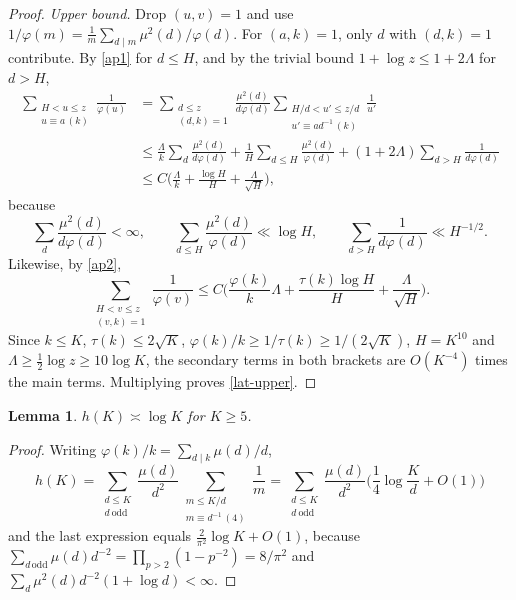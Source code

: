 \documentclass[11pt,reqno]{amsart}
\newtheorem{lemma}[theorem]{Lemma}
\begin{document}
\begin{proof}
\emph{Upper bound.}  Drop $(u,v)=1$ and use $1/\varphi(m)=\frac1m\sum_{d\mid m}\mu^2(d)/\varphi(d)$.
For $(a,k)=1$, only $d$ with $(d,k)=1$ contribute.  By \eqref{ap1} for
$d\le H$, and by the trivial bound $1+\log z\le1+2\Lambda$ for $d>H$,
\[
\begin{aligned}
 \sum_{\substack{H<u\le z\\ u\equiv a\,(k)}}\frac1{\varphi(u)}
 &=\sum_{\substack{d\le z\\(d,k)=1}}\frac{\mu^2(d)}{d\varphi(d)}
   \sum_{\substack{H/d<u'\le z/d\\ u'\equiv ad^{-1}\,(k)}}\frac1{u'}\\
 &\le\frac{\Lambda}{k}\sum_d\frac{\mu^2(d)}{d\varphi(d)}+\frac1H\sum_{d\le H}\frac{\mu^2(d)}{\varphi(d)}
 +(1+2\Lambda)\sum_{d>H}\frac{1}{d\varphi(d)}\\
 &\le C\Big(\frac{\Lambda}{k}+\frac{\log H}{H}+\frac{\Lambda}{\sqrt H}\Big),
\end{aligned}
\]
because
\[
 \sum_d\frac{\mu^2(d)}{d\varphi(d)}<\infty,\qquad
 \sum_{d\le H}\frac{\mu^2(d)}{\varphi(d)}\ll\log H,\qquad
 \sum_{d>H}\frac1{d\varphi(d)}\ll H^{-1/2}.
\]
Likewise, by \eqref{ap2},
\[
 \sum_{\substack{H<v\le z\\(v,k)=1}}\frac1{\varphi(v)}
 \le C\Big(\frac{\varphi(k)}{k}\Lambda+\frac{\tau(k)\log H}{H}+\frac{\Lambda}{\sqrt H}\Big).
\]
Since $k\le K$, $\tau(k)\le2\sqrt K$, $\varphi(k)/k\ge1/\tau(k)\ge1/(2\sqrt K)$,
$H=K^{10}$ and $\Lambda\ge\frac12\log z\ge10\log K$, the secondary terms in
both brackets are $O(K^{-4})$ times the main terms.  Multiplying proves
\eqref{lat-upper}.
\end{proof}

\begin{lemma}\label{lem:h}
$h(K)\asymp\log K$ for $K\ge5$.
\end{lemma}

\begin{proof}
Writing $\varphi(k)/k=\sum_{d\mid k}\mu(d)/d$,
\[
 h(K)=\sum_{\substack{d\le K\\d\ \mathrm{odd}}}\frac{\mu(d)}{d^2}\sum_{\substack{m\le K/d\\ m\equiv d^{-1}\,(4)}}\frac1m
 =\sum_{\substack{d\le K\\d\ \mathrm{odd}}}\frac{\mu(d)}{d^2}\Big(\frac14\log\frac Kd+O(1)\Big)
\]
and the last expression equals $\frac{2}{\pi^2}\log K+O(1)$,
because $\sum_{d\,\mathrm{odd}}\mu(d)d^{-2}=\prod_{p>2}(1-p^{-2})=8/\pi^2$
and $\sum_d\mu^2(d)d^{-2}(1+\log d)<\infty$.
\end{proof}
\end{document}
